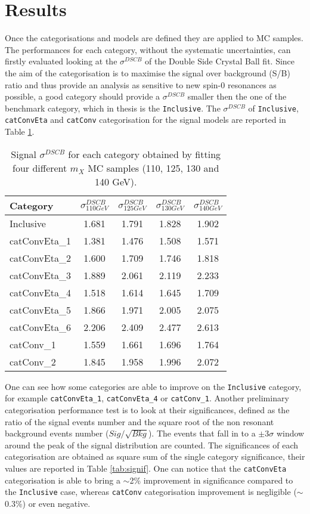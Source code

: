 \documentclass[a4paper, oneside, 11pt, openright]{book}
\begin{document}
 		\section{Results}
 			Once the categorisations and models are defined they are applied to MC samples. The performances for each category, without the systematic uncertainties, can firstly evaluated looking at the $\sigma^{DSCB}$ of the Double Side Crystal Ball fit. Since the aim of the categorisation is to maximise the signal over background (S/B) ratio and thus provide an analysis as sensitive to new spin-0 resonances as possible, a good category should provide a $\sigma^{DSCB}$ smaller then the one of the benchmark category, which in thesis is the \texttt{Inclusive}. The $\sigma^{DSCB}$ of \texttt{Inclusive}, \texttt{catConvEta} and \texttt{catConv} categorisation for the signal models are reported in Table \ref{tab:sigma}.
 			\begin{table}[tbp]
 				\centering
 				\begin{tabular}{lcccc}
 					\toprule[1.5pt]
 					Category		& $\sigma^{DSCB}_{110 GeV}$	& $\sigma^{DSCB}_{125 GeV}$	& $\sigma^{DSCB}_{130 GeV}$ 	& $\sigma^{DSCB}_{140 GeV}$ 	\\
 					\midrule
 					Inclusive 		& 1.681 	& 1.791 	& 1.828 	& 1.902	\\ 
 					\midrule
 					catConvEta\_1 	& 1.381 	& 1.476 	& 1.508 	& 1.571 	\\
 					catConvEta\_2 	& 1.600 	& 1.709  	& 1.746 	& 1.818 	\\ 
 					catConvEta\_3 	& 1.889 	& 2.061 	& 2.119 	& 2.233 	\\ 
 					catConvEta\_4 	& 1.518 	& 1.614 	& 1.645 	& 1.709 	\\ 
 					catConvEta\_5 	& 1.866 	& 1.971 	& 2.005 	& 2.075 	\\ 
 					catConvEta\_6 	& 2.206 	& 2.409 	& 2.477 	& 2.613 	\\
 					\midrule 
 					catConv\_1 		& 1.559 	& 1.661 	& 1.696 	& 1.764 	\\
 					catConv\_2 		& 1.845 	& 1.958 	& 1.996 	& 2.072 	\\
 					\bottomrule[1.5pt]
 				\end{tabular}
 				\caption{Signal $\sigma^{DSCB}$ for each category obtained by fitting four different $m_X$ MC samples (110, 125, 130 and 140 GeV).}
 				\label{tab:sigma}
 			\end{table}
 			One can see how some categories are able to improve on the \texttt{Inclusive} category, for example \texttt{catConvEta\_1}, \texttt{catConvEta\_4} or \texttt{catConv\_1}. Another preliminary categorisation performance test is to look at their significances, defined as the ratio of the signal events number and the square root of the non resonant background events number ($Sig/\sqrt{Bkg}$). The events that fall in to a $\pm3\sigma$ window around the peak of the signal distribution are counted. The significances of each categorisation are obtained as square sum of the single category significance, their values are reported in Table \ref{tab:signif}. One can notice that the \texttt{catConvEta} categorisation is able to bring a $\sim$2\% improvement in significance compared to the \texttt{Inclusive} case, whereas \texttt{catConv} categorisation improvement is negligible ($\sim$0.3\%) or even negative. 
\end{document}
